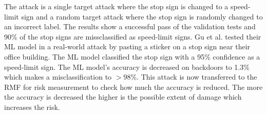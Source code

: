 The attack is a single target attack where the stop sign is changed to a speed-limit sign and a random target attack where the stop sign is randomly changed to an incorrect label. The results show a successful pass of the validation tests and 90\% of the stop signs are missclassified as speed-limit signs. Gu et al. tested their ML model in a real-world attack by pasting a sticker on a stop sign near their office building. The ML model classified the stop sign with a 95\% confidence as a speed-limit sign. The ML model's accuracy is decreased on backdoors to 1.3\% which makes a misclassification to $> 98\%$. This attack is now transferred to the RMF for risk measurement to check how much the accuracy is reduced. The more the accuracy is decreased the higher is the possible extent of damage which increases the risk. \\ \\

